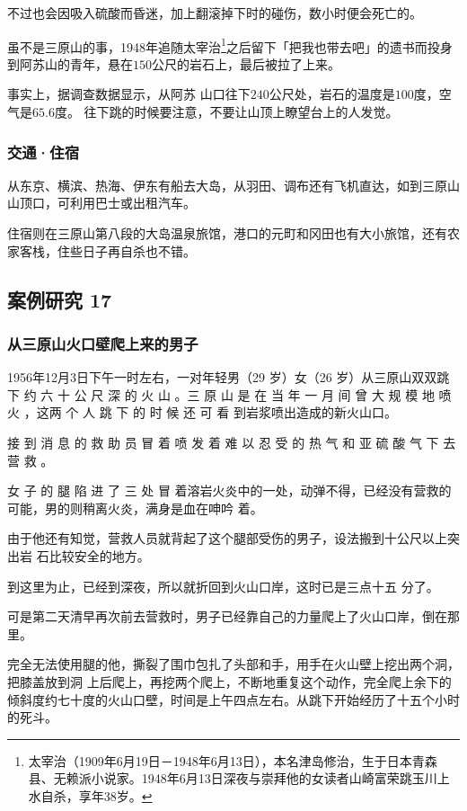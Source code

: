 \documentclass[UTF8]{ctexart}
\begin{document}
不过也会因吸入硫酸而昏迷，加上翻滚掉下时的碰伤，数小时便会死亡的。 

虽不是三原山的事，1948年追随太宰治\footnote{太宰治（1909年6月19日－1948年6月13日），本名津岛修治，生于日本青森县、无赖派小说家。1948年6月13日深夜与崇拜他的女读者山崎富荣跳玉川上水自杀，享年38岁。}之后留下「把我也带去吧」的遗书而投身到阿苏山的青年，悬在$150$公尺的岩石上，最后被拉了上来。

事实上，据调查数据显示，从阿苏 山口往下$240$公尺处，岩石的温度是$100$度，空气$是65.6$度。 往下跳的时候要注意，不要让山顶上瞭望台上的人发觉。

\subsubsection{交通·住宿}

从东京、横滨、热海、伊东有船去大岛，从羽田、调布还有飞机直达，如到三原山山顶口，可利用巴士或出租汽车。

住宿则在三原山第八段的大岛温泉旅馆，港口的元町和冈田也有大小旅馆，还有农家客栈，住些日子再自杀也不错。


\subsection{案例研究 17}

\subsubsection*{从三原山火口壁爬上来的男子}

1956年12月3日下午一时左右，一对年轻男（29 岁）女（26 岁）从三原山双双跳下 约 六 十 公 尺 深 的 火 山 。三 原 山 是 在 当 年 一 月 间 曾 大 规 模 地 喷 火 ，这两 个 人 跳 下 的 时 候 还 可 看 到岩浆喷出造成的新火山口。

接 到 消 息 的 救 助 员 冒 着 喷 发 着 难 以 忍 受 的 热 气 和 亚 硫 酸 气 下 去 营 救 。

女 子 的 腿 陷 进 了 三 处 冒 着溶岩火炎中的一处，动弹不得，已经没有营救的可能，男的则稍离火炎，满身是血在呻吟 着。

由于他还有知觉，营救人员就背起了这个腿部受伤的男子，设法搬到十公尺以上突出岩 石比较安全的地方。

到这里为止，已经到深夜，所以就折回到火山口岸，这时已是三点十五 分了。

可是第二天清早再次前去营救时，男子已经靠自己的力量爬上了火山口岸，倒在那里。

完全无法使用腿的他，撕裂了围巾包扎了头部和手，用手在火山壁上挖出两个洞，把膝盖放到洞 上后爬上，再挖两个爬上，不断地重复这个动作，完全爬上余下的倾斜度约七十度的火山口壁，时间是上午四点左右。从跳下开始经历了十五个小时的死斗。
\end{document}
